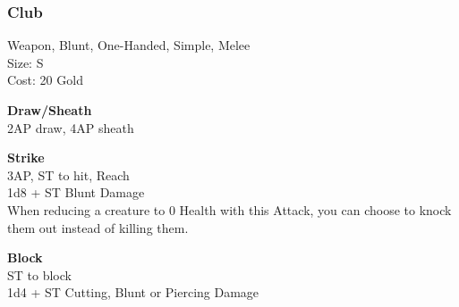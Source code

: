\subsubsection{Club}\label{weapon:club}
Weapon, Blunt, One-Handed, Simple, Melee\\
Size: S\\
Cost: 20 Gold

\textbf{Draw/Sheath}\\
2AP draw, 4AP sheath

\textbf{Strike}\\
3AP, ST to hit,  Reach\\
1d8 + \texttimes ST Blunt Damage\\
When reducing a creature to 0 Health with this Attack, you can choose to knock them out instead of killing them.

\textbf{Block}\\
ST to block\\
1d4 + \texttimes ST Cutting, Blunt or Piercing Damage

